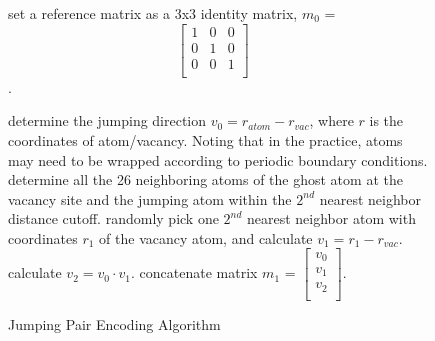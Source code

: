 \begin{figure}[!htb]
  \centering
  \begin{minipage}{.7\linewidth}
    \begin{algorithm}[H]
      \caption{Jumping Pair Encoding Algorithm}\label{algo:encode}
      \begin{algorithmic}[1]
        \State set a reference matrix as a 3x3 identity matrix, $m_0$ = $$\begin{bmatrix} 1 & 0 & 0 \\0 & 1 & 0 \\0 & 0 & 1 \\\end{bmatrix}\quad$$.
        
        \State determine the jumping direction $v_0 = r_{atom} - r_{vac}$, where $r$ is the coordinates of atom/vacancy. Noting that in the practice, atoms may need to be wrapped according to periodic boundary conditions.
        \State determine all the 26 neighboring atoms of the ghost atom at the vacancy site and the jumping atom within the $2^{nd}$ nearest neighbor distance cutoff.
        \State randomly pick one $2^{nd}$ nearest neighbor atom with coordinates $r_1$ of the vacancy atom, and calculate $v_1 = r_{1} - r_{vac}$.
        \State calculate $v_2 = v_0 \cdot v_1$.
        \State concatenate matrix $m_1$ = $\begin{bmatrix} v_0 \\v_1 \\v_2 \\\end{bmatrix}$.
        

\end{algorithmic}
\end{algorithm}
\end{minipage}
\end{figure}
